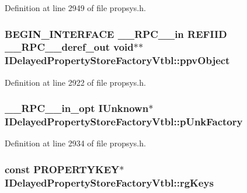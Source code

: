 Definition at line 2949 of file propsys.\+h.

\subsubsection[{\texorpdfstring{ppv\+Object}{ppvObject}}]{\setlength{\rightskip}{0pt plus 5cm}B\+E\+G\+I\+N\+\_\+\+I\+N\+T\+E\+R\+F\+A\+CE {\bf \+\_\+\+\_\+\+R\+P\+C\+\_\+\+\_\+in} {\bf R\+E\+F\+I\+ID} {\bf \+\_\+\+\_\+\+R\+P\+C\+\_\+\+\_\+deref\+\_\+out} {\bf void}$\ast$$\ast$ I\+Delayed\+Property\+Store\+Factory\+Vtbl\+::ppv\+Object}\hypertarget{struct_i_delayed_property_store_factory_vtbl_a57f59525ad8b65d5fd4e893c93774c33}{}\label{struct_i_delayed_property_store_factory_vtbl_a57f59525ad8b65d5fd4e893c93774c33}


Definition at line 2922 of file propsys.\+h.

\subsubsection[{\texorpdfstring{p\+Unk\+Factory}{pUnkFactory}}]{ {\bf \+\_\+\+\_\+\+R\+P\+C\+\_\+\+\_\+in\+\_\+opt} I\+Unknown$\ast$ I\+Delayed\+Property\+Store\+Factory\+Vtbl\+::p\+Unk\+Factory}\hypertarget{struct_i_delayed_property_store_factory_vtbl_a60b7fcd06445bce76571127bcf8b17d8}{}\label{struct_i_delayed_property_store_factory_vtbl_a60b7fcd06445bce76571127bcf8b17d8}


Definition at line 2934 of file propsys.\+h.

\subsubsection[{\texorpdfstring{rg\+Keys}{rgKeys}}]{ {\bf const} {\bf P\+R\+O\+P\+E\+R\+T\+Y\+K\+EY}$\ast$ I\+Delayed\+Property\+Store\+Factory\+Vtbl\+::rg\+Keys}\hypertarget{struct_i_delayed_property_store_factory_vtbl_a1e557c0e57e56d81b0ac16d0cd6e6087}{}\label{struct_i_delayed_property_store_factory_vtbl_a1e557c0e57e56d81b0ac16d0cd6e6087}


